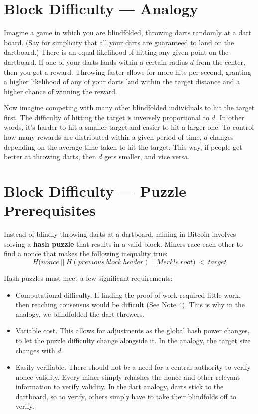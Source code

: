 \documentclass[full.tex]{subfiles}
\begin{document}
    \section*{Block Difficulty --- Analogy}
    
    Imagine a game in which you are blindfolded, throwing darts randomly at a dart board. (Say for simplicity that all your darts are guaranteed to land on the dartboard.) There is an equal likelihood of hitting any given point on the dartboard. If one of your darts lands within a certain radius $d$ from the center, then you get a reward. Throwing faster allows for more hits per second, granting a higher likelihood of any of your darts land within the target distance and a higher chance of winning the reward. 
    
    Now imagine competing with many other blindfolded individuals to hit the target first. The difficulty of hitting the target is inversely proportional to $d$. In other words, it's harder to hit a smaller target and easier to hit a larger one. To control how many rewards are distributed within a given period of time, $d$ changes depending on the average time taken to hit the target. This way, if people get better at throwing darts, then $d$ gets smaller, and vice versa.
    
    \section*{Block Difficulty --- Puzzle Prerequisites}
    
    Instead of blindly throwing darts at a dartboard, mining in Bitcoin involves solving a \textbf{hash puzzle} that results in a valid block. Miners race each other to find a nonce that makes the following inequality true:
    $$H\big(nonce~||~H(previous~block~header)~||~Merkle~root\big)~<~target$$
    
    \noindent Hash puzzles must meet a few significant requirements:
    \begin{itemize}
        \item Computational difficulty. If finding the proof-of-work required little work, then reaching consensus would be difficult (See Note 4). This is why in the analogy, we blindfolded the dart-throwers. 
        \item Variable cost. This allows for adjustments as the global hash power changes, to let the puzzle difficulty change alongside it. In the analogy, the target size changes with $d$.
        \item Easily verifiable. There should not be a need for a central authority to verify nonce validity. Every miner simply rehashes the nonce and other relevant information to verify validity. In the dart analogy, darts stick to the dartboard, so to verify, others simply have to take their blindfolds off to verify.
    \end{itemize}
    
\end{document}
